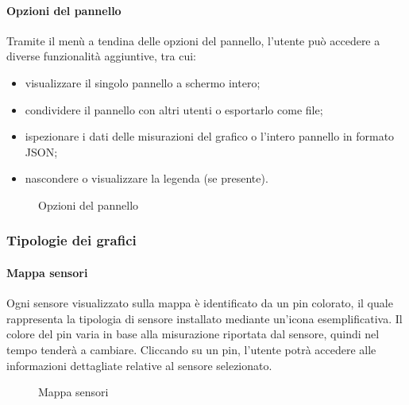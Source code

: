 \paragraph{Opzioni del pannello}
Tramite il menù a tendina delle opzioni del pannello, l'utente può accedere a diverse funzionalità aggiuntive, tra cui:
\begin{itemize}
    \item visualizzare il singolo pannello a schermo intero;
    \item condividere il pannello con altri utenti o esportarlo come file;
    \item ispezionare i dati delle misurazioni del grafico o l'intero pannello in formato JSON;
    \item nascondere o visualizzare la legenda (se presente).
\end{itemize}
\begin{figure}[H]
    \centering
    \caption{Opzioni del pannello}
    \label{fig:my_label}
\end{figure}


\subsubsection{Tipologie dei grafici}
\label{subsec:tipologie_grafici}

\paragraph{Mappa sensori}
\hypertarget{par:mappa_sensori}{}
Ogni sensore visualizzato sulla mappa è identificato da un pin colorato, il quale rappresenta la tipologia di sensore installato mediante un'icona esemplificativa. Il colore del pin varia in base alla misurazione riportata dal sensore, quindi nel tempo tenderà a cambiare. Cliccando su un pin, l'utente potrà accedere alle informazioni dettagliate relative al sensore selezionato.
\begin{figure}[H]
    \centering
    \caption{Mappa sensori}
    \label{fig:my_label}
\end{figure}


